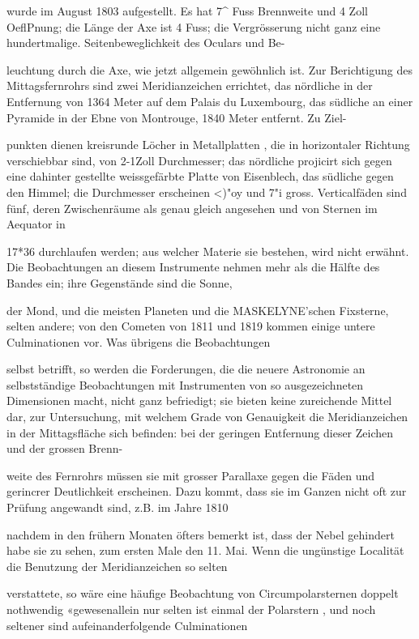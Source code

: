 \documentclass[10pt,a4paper]{article}
\begin{document}
wurde im August 1803 aufgestellt. Es hat 7\textasciicircum{} Fuss Brennweite und 4 Zoll OeflPnung; die Länge der Axe ist 4 Fuss; die Vergrösserung nicht ganz eine hundertmalige. Seitenbeweglichkeit des Oculars und Be-

leuchtung durch die Axe, wie jetzt allgemein gewöhnlich ist. Zur Berichtigung des Mittagsfernrohrs sind zwei Meridianzeichen errichtet, das nördliche in der Entfernung von 1364 Meter auf dem Palais du Luxembourg, das südliche an einer Pyramide in der Ebne von Montrouge, 1840 Meter entfernt. Zu Ziel-

punkten dienen kreisrunde Löcher in Metallplatten , die in horizontaler Richtung verschiebbar sind, von 2-1Zoll Durchmesser; das nördliche projicirt sich gegen eine dahinter gestellte weissgefärbte Platte von Eisenblech, das südliche gegen den Himmel; die Durchmesser erscheinen <)"oy und 7"i gross. Verticalfäden sind fünf, deren Zwischenräume als genau gleich angesehen und von Sternen im Aequator in

17*36 durchlaufen werden; aus welcher Materie sie bestehen, wird nicht erwähnt. Die Beobachtungen an diesem Instrumente nehmen mehr als die Hälfte des Bandes ein; ihre Gegenstände sind die Sonne,

der Mond, und die meisten Planeten und die MASKELYNE'schen Fixsterne, selten andere; von den Cometen von 1811 und 1819 kommen einige untere Culminationen vor. Was übrigens die Beobachtungen

selbst betrifft, so werden die Forderungen, die die neuere Astronomie an selbstständige Beobachtungen mit Instrumenten von so ausgezeichneten Dimensionen macht, nicht ganz befriedigt; sie bieten keine zureichende Mittel dar, zur Untersuchung, mit welchem Grade von Genauigkeit die Meridianzeichen in der Mittagsfläche sich befinden: bei der geringen Entfernung dieser Zeichen und der grossen Brenn-

weite des Fernrohrs müssen sie mit grosser Parallaxe gegen die Fäden und gerincrer Deutlichkeit erscheinen. Dazu kommt, dass sie im Ganzen nicht oft zur Prüfung angewandt sind, z.B. im Jahre 1810

nachdem in den frühern Monaten öfters bemerkt ist, dass der Nebel gehindert habe sie zu sehen, zum ersten Male den 11. Mai. Wenn die ungünstige Localität die Benutzung der Meridianzeichen so selten

verstattete, so wäre eine häufige Beobachtung von Circumpolarsternen doppelt nothwendig «gewesenallein nur selten ist einmal der Polarstern , und noch seltener sind aufeinanderfolgende Culminationen
\end{document}
